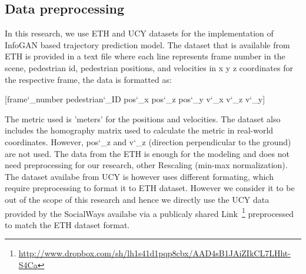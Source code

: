 \subsection{Data preprocessing}
In this research, we use ETH and UCY datasets for the implementation of InfoGAN based trajectory prediction model. The dataset that is available from ETH is provided in a text file where each line represents frame number in the scene, pedestrian id, pedestrian positions, and velocities in x y z coordinates for the respective frame, the data is formatted as:
\begin{center}
  [frame\char`_number pedestrian\char`_ID pos\char`_x pos\char`_z pos\char`_y v\char`_x v\char`_z v\char`_y]
\end{center}
The metric used is 'meters' for the positions and velocities. The dataset also includes the homography matrix used to calculate the metric in real-world coordinates. However, pos\char`_z and v\char`_z (direction perpendicular to the ground) are not used. The data from the ETH is enough for the modeling and does not need preprocessing for our research, other Rescaling (min-max normalization).\newline
The dataset availabe from UCY is however uses different formating, which require preprocessing to format it to ETH dataset. However we consider it to be out of the scope of this research and hence we directly use the UCY data provided by the SocialWays\cite[]{DBLP:journals/corr/ChenDHSSA16} availabe via a publicaly shared Link~\footnote{\url{http://www.dropbox.com/sh/lh1s41d1pqp8cbx/AAD4sB1JAiZIkCL7LHht-S4Ca}} preprocessed to match the ETH dataset format.
